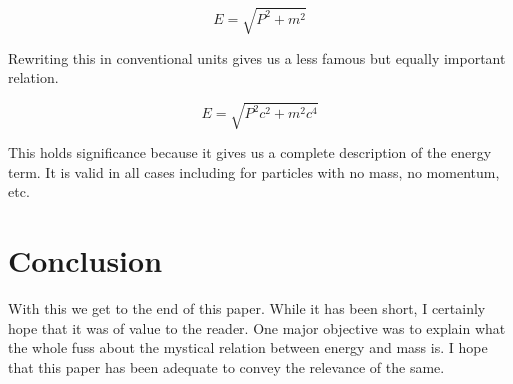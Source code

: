 \documentclass[16pt]{scrartcl}
\numberwithin{equation}{section}
\theoremstyle{plain}
\theoremstyle{definition}
\begin{document}
\begin{equation}
    E = \sqrt{P^2+m^2}
    \label{eq:epm-relation}
\end{equation}

Rewriting this in conventional units gives us a less famous but equally important relation. 

\begin{equation}
    E = \sqrt{P^2c^2+m^2c^4}
    \label{eq:epm-relation-conventional}
\end{equation}

This holds significance because it gives us a complete description of the energy term. It is valid in all cases including for particles with no mass, no momentum, etc.

\section{Conclusion}

With this we get to the end of this paper. While it has been short, I certainly hope that it was of value to the reader. One major objective was to explain what the whole fuss about the mystical relation between energy and mass is. I hope that this paper has been adequate to convey the relevance of the same.
\end{document}
